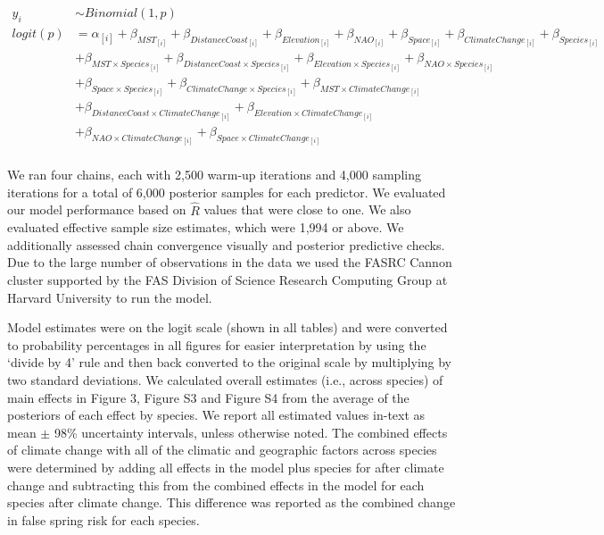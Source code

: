 \documentclass{article}\usepackage[]{graphicx}\usepackage[]{color}
\begin{document}
\begin{align*}
 y_i & \sim Binomial(1,p) \tag{1} \\
logit(p) &= \alpha_{[i]} + \beta_{MST_{[i]}} + \beta_{DistanceCoast_{[i]}} + \beta_{Elevation_{[i]}} + \beta_{NAO_{[i]}} + \beta_{Space_{[i]}} + \beta_{ClimateChange_{[i]}} + \beta_{Species_{[i]}} \\ 
  &+ \beta_{MST \times Species_{[i]}} + \beta_{DistanceCoast \times Species_{[i]}} + \beta_{Elevation \times Species_{[i]}} + \beta_{NAO \times Species_{[i]}}\\
  &+ \beta_{Space \times Species_{[i]}} + \beta_{ClimateChange \times Species_{[i]}} + \beta_{MST \times ClimateChange_{[i]}}\\ 
  &+ \beta_{DistanceCoast \times ClimateChange_{[i]}} + \beta_{Elevation \times ClimateChange_{[i]}}\\ 
  &+ \beta_{NAO \times ClimateChange_{[i]}} + \beta_{Space \times ClimateChange_{[i]}} \nonumber\\
\end{align*}

We ran four chains, each with 2,500 warm-up iterations and 4,000 sampling iterations for a total of 6,000 posterior samples for each predictor. We evaluated our model performance based on $\hat{R}$ values that were close to one. We also evaluated effective sample size estimates, which were 1,994 or above. We additionally assessed chain convergence visually and posterior predictive checks. Due to the large number of observations in the data we used the FASRC Cannon cluster supported by the FAS Division of Science Research Computing Group at Harvard University to run the model.

Model estimates were on the logit scale (shown in all tables) and were converted to probability percentages in all figures for easier interpretation by using the `divide by 4' rule \citep{Gelman2006} and then back converted to the original scale by multiplying by two standard deviations. We calculated overall estimates (i.e., across species) of main effects in Figure 3, Figure S3 and Figure S4 from the average of the posteriors of each effect by species. We report all estimated values in-text as mean $\pm$ 98\% uncertainty intervals, unless otherwise noted. The combined effects of climate change with all of the climatic and geographic factors across species were determined by adding all effects in the model plus species for after climate change and subtracting this from the combined effects in the model for each species after climate change. This difference was reported as the combined change in false spring risk for each species.
\end{document}
